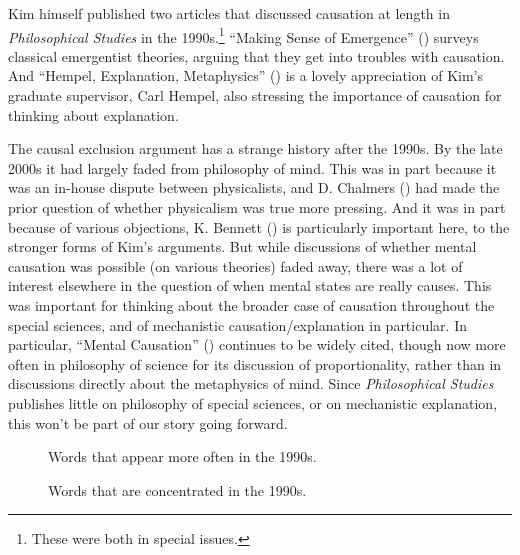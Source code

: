 \documentclass[
  10pt,
  letterpaper,
  DIV=11,
  numbers=noendperiod,
  twoside]{scrartcl}
\begin{document}
Kim himself published two articles that discussed causation at length in
\emph{Philosophical Studies} in the 1990s.\footnote{These were both in
  special issues.} ``Making Sense of Emergence''
() surveys classical
emergentist theories, arguing that they get into troubles with
causation. And ``Hempel, Explanation, Metaphysics''
() is a lovely appreciation
of Kim's graduate supervisor, Carl Hempel, also stressing the importance
of causation for thinking about explanation.

The causal exclusion argument has a strange history after the 1990s. By
the late 2000s it had largely faded from philosophy of mind. This was in
part because it was an in-house dispute between physicalists, and D.
Chalmers () had made the prior question
of whether physicalism was true more pressing. And it was in part
because of various objections, K. Bennett
() is particularly important
here, to the stronger forms of Kim's arguments. But while discussions of
whether mental causation was possible (on various theories) faded away,
there was a lot of interest elsewhere in the question of when mental
states are really causes. This was important for thinking about the
broader case of causation throughout the special sciences, and of
mechanistic causation/explanation in particular. In particular, ``Mental
Causation'' () continues to
be widely cited, though now more often in philosophy of science for its
discussion of proportionality, rather than in discussions directly about
the metaphysics of mind. Since \emph{Philosophical Studies} publishes
little on philosophy of special sciences, or on mechanistic explanation,
this won't be part of our story going forward.

\begin{figure}


\caption{\label{fig-1990s-words-big}Words that appear more often in the
1990s.}

\end{figure}%

\begin{figure}


\caption{\label{fig-1990s-words-small}Words that are concentrated in the
1990s.}

\end{figure}%
\end{document}
